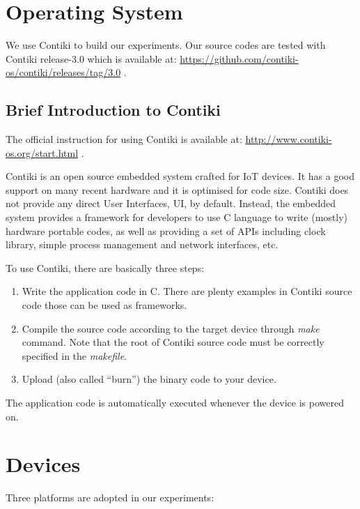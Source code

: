 \section{Operating System}

We use Contiki\cite{Contiki} to build our experiments.  Our source codes are tested with Contiki release-3.0 which is available at: \url{https://github.com/contiki-os/contiki/releases/tag/3.0} .

\subsection{Brief Introduction to Contiki}

The official instruction for using Contiki is available at:	\url{http://www.contiki-os.org/start.html} .


Contiki is an open source embedded system crafted for IoT devices. It has a good support on many recent hardware and it is optimised for code size. Contiki does not provide any direct User Interfaces, UI, by default. Instead, the embedded system provides a framework for developers to use C language to write (mostly) hardware portable codes, as well as providing a set of APIs including clock library, simple process management and network interfaces, etc.

To use Contiki, there are basically three steps:

\begin{enumerate}
	\item Write the application code in C. There are plenty examples in Contiki source code those can be used as frameworks.
	\item Compile the source code according to the target device through \textit{make} command. Note that the root of Contiki source code must be correctly specified in the \textit{makefile}. 
	\item Upload (also called ``burn'') the binary code to your device. 
\end{enumerate}

The application code is automatically executed whenever the device is powered on.

\section{Devices}

Three platforms are adopted in our experiments:

